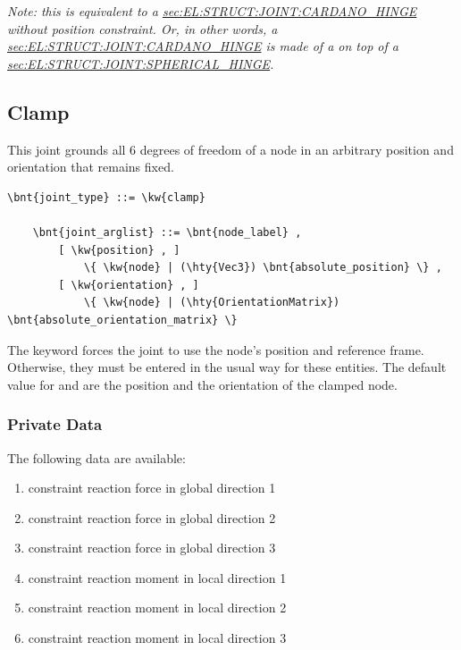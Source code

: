 \emph{Note: this is equivalent to a
\hyperref{\kw{Cardano hinge}}{\kw{Cardano hinge} (see Section~}{)}{sec:EL:STRUCT:JOINT:CARDANO_HINGE}
without position constraint.
Or, in other words, a 
\hyperref{\kw{Cardano hinge}}{\kw{Cardano hinge} (see Section~}{)}{sec:EL:STRUCT:JOINT:CARDANO_HINGE}
is made of a  on top of a 
\hyperref{\kw{spherical hinge}}{\kw{spherical hinge} (see Section~}{)}{sec:EL:STRUCT:JOINT:SPHERICAL_HINGE}.
}



\subsection{Clamp}
This joint grounds all 6 degrees of freedom of a node
in an arbitrary position and orientation that remains fixed.
\begin{Verbatim}[commandchars=\\\{\}]
    \bnt{joint_type} ::= \kw{clamp}

    \bnt{joint_arglist} ::= \bnt{node_label} ,
        [ \kw{position} , ]
            \{ \kw{node} | (\hty{Vec3}) \bnt{absolute_position} \} ,
        [ \kw{orientation} , ]
            \{ \kw{node} | (\hty{OrientationMatrix}) \bnt{absolute_orientation_matrix} \}
\end{Verbatim}
The keyword  forces the joint to use
the node's position and reference frame. Otherwise, they must be entered
in the usual way for these entities.
The default value for  and 
are the position and the orientation of the clamped node.

\subsubsection{Private Data}
The following data are available:
\begin{enumerate}
\item {} constraint reaction force in global direction 1
\item {} constraint reaction force in global direction 2
\item {} constraint reaction force in global direction 3
\item {} constraint reaction moment in local direction 1
\item {} constraint reaction moment in local direction 2
\item {} constraint reaction moment in local direction 3
\end{enumerate}




